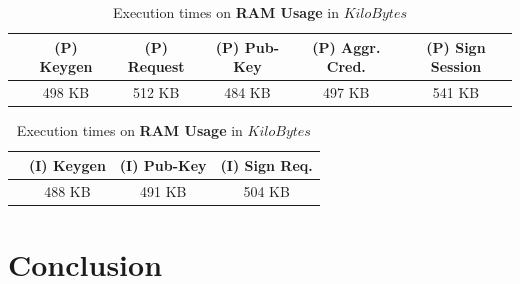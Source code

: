 \documentclass[twocolumn]{article}
\begin{document}
\begin{table}[h!]
  \begin{center}
    \caption{Execution times on \textbf{RAM Usage} in $KiloBytes$}
      \label{tab:table1}
        \begin{tabular} {c|c|c|c|c|c}
          \toprule
         & \textbf{(P) Keygen} & \textbf{(P) Request} & \textbf{(P) Pub-Key} & \textbf{(P) Aggr. Cred.} & \textbf{(P) Sign Session} \\
          \midrule
 			& 498 KB	&  512 KB	&  484 KB	&  497 KB	&  541 KB	\\


      \bottomrule %
    \end{tabular}
  \end{center}
\end{table}

\begin{table}[h!]
  \begin{center}
    \caption{Execution times on \textbf{RAM Usage} in $KiloBytes$}
      \label{tab:table1}
        \begin{tabular} {c|c|c|c}
          \toprule
          &  \textbf{(I) Keygen}& \textbf{(I) Pub-Key}& \textbf{(I) Sign Req.} \\
          \midrule
				&	488 KB	&  491 KB	&  504 KB	\\
      \bottomrule %
    \end{tabular}
  \end{center}
\end{table}

\newpage

\twocolumn

\section{Conclusion}







\listoffigures

\end{document}
